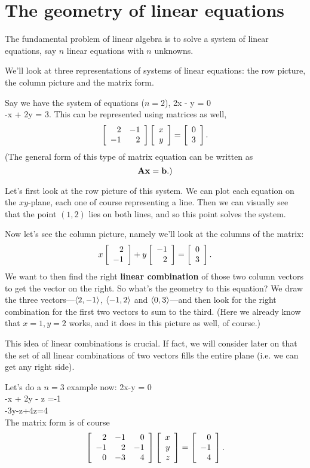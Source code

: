 \section{The geometry of linear equations}

The fundamental problem of linear algebra is to solve a system of linear equations, say $n$ linear equations with $n$ unknowns.

We'll look at three representations of systems of linear equations: the row picture, the column picture and the matrix form. 

\bex
Say we have the system of equations ($n=2$),
\bea
2x - y = 0 \\
-x + 2y = 3. 
\eea
This can be represented using matrices as well,
\[ \left[ \begin{array}{rrrrrrrrrrrrrrrrrrrrrrrrr} 2&-1\\-1&2\\ \end{array} \right]\left[ \begin{array}{rrrrrrrrrrrrrrrrrrrrrrrrr} x\\y\\ \end{array} \right]=\left[ \begin{array}{rrrrrrrrrrrrrrrrrrrrrrrrr} 0\\3\\ \end{array} \right]. \]
(The general form of this type of matrix equation can be written as
\[ \boldsymbol{\mathbf{A}}\boldsymbol{\mathbf{x}} = \boldsymbol{\mathbf{b}}.) \]

Let's first look at the row picture of this system. We can plot each equation on the $xy$-plane, each one of course representing a line. Then we can visually see that the point $(1, 2)$ lies on both lines, and so this point solves the system.

Now let's see the column picture, namely we'll look at the columns of the matrix:
\[ x\left[ \begin{array}{rrrrrrrrrrrrrrrrrrrrrrrrr} 2\\-1\\ \end{array} \right]+y\left[ \begin{array}{rrrrrrrrrrrrrrrrrrrrrrrrr} -1\\2\\ \end{array} \right]=\left[ \begin{array}{rrrrrrrrrrrrrrrrrrrrrrrrr} 0\\3\\ \end{array} \right]. \]
We want to then find the right \textbf{linear combination} of those two column vectors to get the vector on the right. So what's the geometry to this equation? We draw the three vectors---$\langle 2,-1 \rangle$, $\langle -1,2 \rangle$ and $\langle 0,3 \rangle$---and then look for the right combination for the first two vectors to sum to the third. (Here we already know that $x=1,y=2$ works, and it does in this picture as well, of course.) 

This idea of linear combinations is crucial. If fact, we will consider later on that the set of all linear combinations of two vectors fills the entire plane (i.e. we can get any right side).
\eex

\bex
Let's do a $n=3$ example now:
\bea
2x-y = 0 \\
-x + 2y - z =-1\\
-3y-z+4z=4\\
\eea
The matrix form is of course
\[ \left[ \begin{array}{rrrrrrrrrrrrrrrrrrrrrrrrr} 2&-1&0\\-1&2&-1\\0&-3&4\\ \end{array} \right]\left[ \begin{array}{rrrrrrrrrrrrrrrrrrrrrrrrr} x\\y\\z\\ \end{array} \right] = \left[ \begin{array}{rrrrrrrrrrrrrrrrrrrrrrrrr} 0\\-1\\4\\ \end{array} \right]. \]


